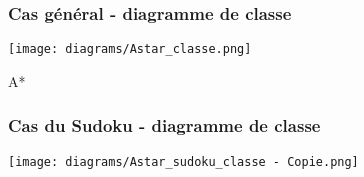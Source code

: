 
\begin{frame}
	\frametitle{Cas général - diagramme de classe}

\begin{center}

\texttt{[image: diagrams/Astar\_classe.png]}

\end{center}

\end{frame}


\begin{frame}{A*}

\frametitle{Cas du Sudoku - diagramme de classe}

\begin{center}

\texttt{[image: diagrams/Astar\_sudoku\_classe - Copie.png]}

\end{center}

\end{frame}